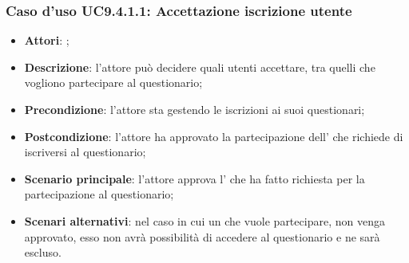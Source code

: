 			 \subsubsection{Caso d'uso UC9.4.1.1: Accettazione iscrizione utente}
			 \label{UC9.4.1.1}
			 \begin{itemize}
			 	\item \textbf{Attori}: \uaupro{};
			 	\item \textbf{Descrizione}: l'attore può decidere quali utenti accettare, tra quelli che vogliono partecipare al questionario; 
			 	\item \textbf{Precondizione}: l'attore sta gestendo le iscrizioni ai suoi questionari;
			 	\item \textbf{Postcondizione}: l'attore ha approvato la partecipazione dell'\uau{} che richiede di iscriversi al questionario;
			 	\item \textbf{Scenario principale}: l'attore approva l'\uau{} che ha fatto richiesta per la partecipazione al questionario; 
			 	\item \textbf{Scenari alternativi}: nel caso in cui un \uau{} che vuole partecipare, non venga approvato, esso non avrà possibilità di accedere al questionario e ne sarà escluso.
			 \end{itemize}
			
				